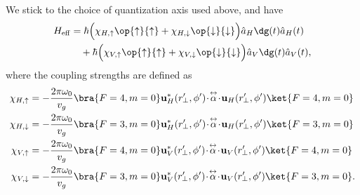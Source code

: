 \documentclass[]{report}
\newcommand{\tensor}[1]{\overset{\leftrightarrow}{#1}} %
\begin{document}
We stick to the choice of quantization axis used above, and have
\begin{align}
H_{\rm eff} & =  \hbar \Big( \chi_{H,\uparrow}\op{\uparrow}{\uparrow} +  
\chi_{H,\downarrow} \op{\downarrow}{\downarrow} \Big) \hat{a}_H\dg(t) \hat{a}_H(t) \nonumber\\
&\quad +  \hbar  \Big( \chi_{V,\uparrow}\op{\uparrow}{\uparrow} +  \chi_{V,\downarrow} 
\op{\downarrow}{\downarrow} \Big) \hat{a}_V\dg(t) \hat{a}_V(t)  ,\label{eq:Heffupdown}
\end{align}
where the coupling strengths are defined as
\begin{align}
\chi_{H,\uparrow} &=  -\frac{2\pi\omega_0}{v_g} \bra{F=4,m=0} 
\mathbf{u}^*_{H}(r^\prime\!\!_\perp,\phi') \!\cdot\!\tensor{\alpha}\!\cdot\! 
\mathbf{u}_{H}(r^\prime\!\!_\perp,\phi') \ket{F=4,m=0}\\
\chi_{H,\downarrow} &=  -\frac{2\pi\omega_0}{v_g}  \bra{F=3,m=0} 
\mathbf{u}^*_{H}(r^\prime\!\!_\perp,\phi') \!\cdot\!\tensor{\alpha}\!\cdot\! 
\mathbf{u}_{H}(r^\prime\!\!_\perp,\phi') \ket{F=3,m=0} \\
\chi_{V,\uparrow} &=  -\frac{2\pi\omega_0}{v_g}   \bra{F=4,m=0} 
\mathbf{u}^*_{V}(r^\prime\!\!_\perp,\phi') \!\cdot\!\tensor{\alpha}\!\cdot\! 
\mathbf{u}_{V}(r^\prime\!\!_\perp,\phi') \ket{F=4,m=0}  \\
\chi_{V,\downarrow} &=  -\frac{2\pi\omega_0}{v_g}  \bra{F=3,m=0} 
\mathbf{u}^*_{V}(r^\prime\!\!_\perp,\phi') \!\cdot\!\tensor{\alpha}\!\cdot\! 
\mathbf{u}_{V}(r^\prime\!\!_\perp,\phi') \ket{F=3,m=0}. 
\end{align}
\end{document}
